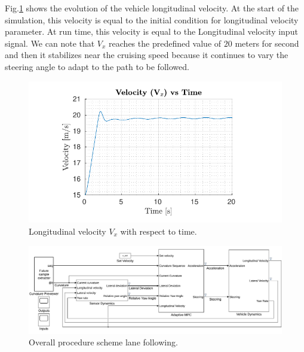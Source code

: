 \documentclass[conference, 11pt]{IEEEtran}
\begin{document}
Fig.{\ref{fig:longitudinal_velocity_laneFollowing}} shows the evolution of the vehicle longitudinal velocity. At the start of the simulation, this velocity is equal to the initial condition for longitudinal velocity parameter. At run time, this velocity is equal to the Longitudinal velocity input signal. We can note that $V_x$ reaches the predefined value of $20$ meters for second and then it stabilizes near the cruising speed because it continues to vary the steering angle to adapt to the path to be followed.
\begin{figure}[!h]
	\centering
	\includegraphics[width=\columnwidth]{../../MATLAB/lane_following/figure/LongitudinalVelocityVsTime.pdf}
	\caption{Longitudinal velocity $V_x$ with respect to time.}
	\label{fig:longitudinal_velocity_laneFollowing}
\end{figure}
\begin{figure}[!h]
	\centering
	\includegraphics[width=\textwidth]{./figure/lane_following_AMPC.pdf}
	\caption{Overall procedure scheme lane following.}
	\label{fig:scheme_lane_following}
\end{figure}
\end{document}
